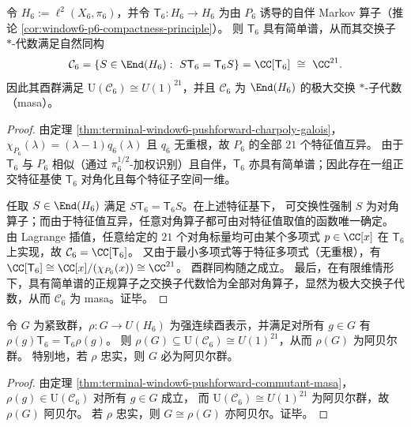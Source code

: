 \begin{theorem}\label{thm:terminal-window6-pushforward-commutant-masa}
令 \(H_6:=\ell^2(X_6,\pi_6)\)，并令 \(\mathsf{T}_6:H_6\to H_6\) 为由 \(P_6\) 诱导的自伴 Markov 算子（推论 \ref{cor:window6-p6-compactness-principle}）。
则 \(\mathsf{T}_6\) 具有简单谱，从而其交换子 \(*\)-代数满足自然同构
\[
\mathcal C_6
=\{S\in\End(H_6):\ S\mathsf{T}_6=\mathsf{T}_6S\}
=\CC[\mathsf{T}_6]
\ \cong\ \CC^{21}.
\]
因此其酉群满足
\(
\mathrm U(\mathcal C_6)\cong U(1)^{21}
\)，并且 \(\mathcal C_6\) 为 \(\End(H_6)\) 的极大交换 \(*\)-子代数（masa）。
\end{theorem}
\begin{proof}
由定理 \ref{thm:terminal-window6-pushforward-charpoly-galois}，\(\chi_{P_6}(\lambda)=(\lambda-1)q_6(\lambda)\) 且 \(q_6\) 无重根，故 \(P_6\) 的全部 \(21\) 个特征值互异。
由于 \(\mathsf{T}_6\) 与 \(P_6\) 相似（通过 \(\pi_6^{1/2}\)-加权识别）且自伴，\(\mathsf{T}_6\) 亦具有简单谱；因此存在一组正交特征基使 \(\mathsf{T}_6\) 对角化且每个特征子空间一维。
\par
任取 \(S\in\End(H_6)\) 满足 \(S\mathsf{T}_6=\mathsf{T}_6S\)。在上述特征基下，
可交换性强制 \(S\) 为对角算子；而由于特征值互异，任意对角算子都可由对特征值取值的函数唯一确定。
由 Lagrange 插值，任意给定的 \(21\) 个对角标量均可由某个多项式 \(p\in\CC[x]\) 在 \(\mathsf{T}_6\) 上实现，故 \(\mathcal C_6=\CC[\mathsf{T}_6]\)。
又由于最小多项式等于特征多项式（无重根），有
\(
\CC[\mathsf{T}_6]\cong \CC[x]/(\chi_{P_6}(x))\cong\CC^{21}
\)。
酉群同构随之成立。
最后，在有限维情形下，具有简单谱的正规算子之交换子代数恰为全部对角算子，显然为极大交换子代数，从而 \(\mathcal C_6\) 为 masa。证毕。
\end{proof}

\begin{corollary}[推送动力学层面不存在非阿贝尔紧致对称]\label{cor:terminal-window6-pushforward-no-nonabelian-compact-symmetry}
令 \(G\) 为紧致群，\(\rho:G\to U(H_6)\) 为强连续酉表示，并满足对所有 \(g\in G\) 有
\(
\rho(g)\mathsf{T}_6=\mathsf{T}_6\rho(g)
\)。
则 \(\rho(G)\subseteq \mathrm U(\mathcal C_6)\cong U(1)^{21}\)，从而 \(\rho(G)\) 为阿贝尔群。
特别地，若 \(\rho\) 忠实，则 \(G\) 必为阿贝尔群。
\end{corollary}
\begin{proof}
由定理 \ref{thm:terminal-window6-pushforward-commutant-masa}，
\(\rho(g)\in \mathrm U(\mathcal C_6)\) 对所有 \(g\in G\) 成立，
而 \(\mathrm U(\mathcal C_6)\cong U(1)^{21}\) 为阿贝尔群，故 \(\rho(G)\) 阿贝尔。
若 \(\rho\) 忠实，则 \(G\cong \rho(G)\) 亦阿贝尔。证毕。
\end{proof}
